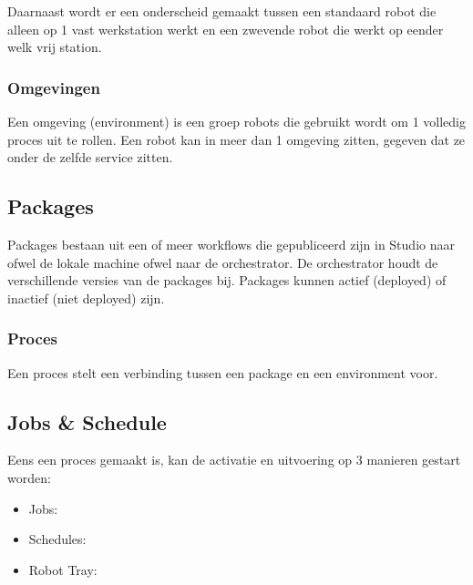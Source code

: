 Daarnaast wordt er een onderscheid gemaakt tussen een standaard robot die alleen op 1 vast werkstation werkt en een zwevende robot die werkt op eender welk vrij station.

\subsubsection{Omgevingen}
Een omgeving (environment) is een groep robots die gebruikt wordt om 1 volledig proces uit te rollen. Een robot kan in meer dan 1 omgeving zitten, gegeven dat ze onder de zelfde service zitten.

\subsection{Packages}
Packages bestaan uit een of meer workflows die gepubliceerd zijn in Studio naar ofwel de lokale machine ofwel naar de orchestrator. De orchestrator houdt de verschillende versies van de packages bij. Packages kunnen actief (deployed) of inactief (niet deployed) zijn.

\subsubsection{Proces}
Een proces stelt een verbinding tussen een package en een environment voor.

\subsection{Jobs \& Schedule}
Eens een proces gemaakt is, kan de activatie en uitvoering op 3 manieren gestart worden:
\begin{itemize}
	\item Jobs: 
	\item Schedules: 
	\item Robot Tray: 
\end{itemize}